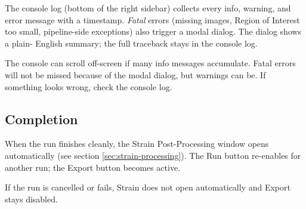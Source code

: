 The console log (bottom of the right sidebar) collects every info,
warning, and error message with a timestamp. \emph{Fatal} errors
(missing images, Region of Interest too small, pipeline-side
exceptions) also trigger a modal dialog. The dialog shows a plain-
English summary; the full traceback stays in the console log.

\begin{warnbox}
The console can scroll off-screen if many info messages accumulate.
Fatal errors will not be missed because of the modal dialog, but
warnings can be. If something looks wrong, check the console log.
\end{warnbox}

\subsection{Completion}

When the run finishes cleanly, the Strain Post-Processing window
opens automatically (see section \ref{sec:strain-processing}). The
Run button re-enables for another run; the Export button becomes
active.

If the run is cancelled or fails, Strain does not open automatically
and Export stays disabled.
